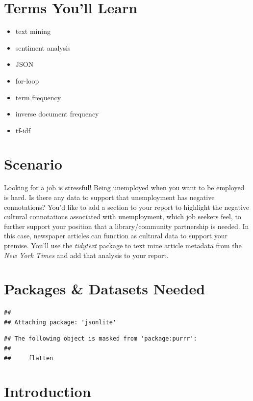 \documentclass[
  krantz2]{krantz}
\providecommand{\tightlist}{%
  \setlength{\itemsep}{0pt}\setlength{\parskip}{0pt}}
\begin{document}
\hypertarget{text-terms}{%
\section{Terms You'll Learn}\label{text-terms}}

\begin{itemize}
\tightlist
\item
  text mining
\item
  sentiment analysis
\item
  JSON
\item
  for-loop
\item
  term frequency
\item
  inverse document frequency
\item
  tf-idf
\end{itemize}

\hypertarget{text-scenario}{%
\section{Scenario}\label{text-scenario}}

Looking for a job is stressful! Being unemployed when you want to be employed is hard. Is there any data to support that unemployment has negative connotations? You'd like to add a section to your report to highlight the negative cultural connotations associated with unemployment, which job seekers feel, to further support your position that a library/community partnership is needed. In this case, newspaper articles can function as cultural data to support your premise. You'll use the \emph{tidytext} package to text mine article metadata from the \emph{New York Times} and add that analysis to your report.

\hypertarget{text-pkgs}{%
\section{Packages \& Datasets Needed}\label{text-pkgs}}

\begin{verbatim}
##
## Attaching package: 'jsonlite'
\end{verbatim}

\begin{verbatim}
## The following object is masked from 'package:purrr':
##
##     flatten
\end{verbatim}

\hypertarget{text-intro}{%
\section{Introduction}\label{text-intro}}
\end{document}
